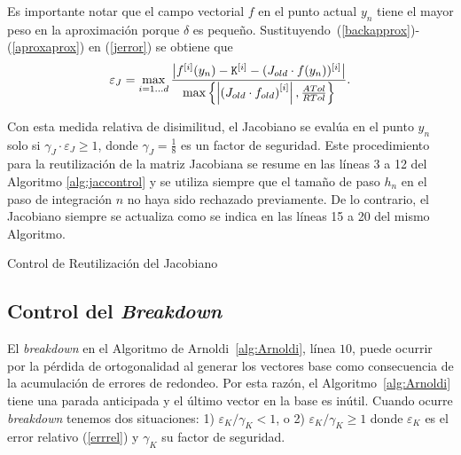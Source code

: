 Es importante notar que el campo vectorial $f$ en el punto actual $y_n$ tiene el mayor peso en la aproximación porque $\delta$
es pequeño. Sustituyendo~(\ref{backapprox})-(\ref{aproxaprox}) en (\ref{jerror}) se obtiene que
\begin{equation}\label{jerroraprox}
    \varepsilon_J = \max_{i=1\ldots d}\frac{\left\lvert f^{[i]}(y_n) - \mathtt{K}^{[i]} - (J_{old}\cdot f(y_n))^{[i]} \right\rvert}
    {\max\left\{ \left\lvert  \left(J_{old}\cdot f_{old}\right)^{[i]}  \right\rvert ,\frac{ATol}{RTol} \right\}}.
\end{equation}

Con esta medida relativa de disimilitud, el Jacobiano se evalúa en el punto $y_n$ solo si $\gamma_J \cdot \varepsilon_J \geq 1$, donde $\gamma_J=\frac{1}{8}$ es un factor de seguridad. Este procedimiento para la reutilización de la matriz Jacobiana se resume en las líneas 3 a 12 del Algoritmo \ref{alg:jaccontrol} y se utiliza siempre que el tamaño de paso $h_n$ en el paso de integración $n$ no haya sido rechazado previamente. De lo contrario, el Jacobiano siempre se actualiza como se indica en las líneas 15 a 20 del mismo Algoritmo.

{\SetAlgoNoLine
\begin{algorithm}[h]
	\caption{Control de Reutilización del Jacobiano}
	\label{alg:jaccontrol}
	{
	}
\end{algorithm}
}

\subsection{Control del \textit{Breakdown}}\label{sec:brcontrol}
El \emph{breakdown} en el Algoritmo de Arnoldi~\ref{alg:Arnoldi}, línea $10$, puede ocurrir por la pérdida de ortogonalidad al generar los vectores base como consecuencia de la acumulación de errores de redondeo. Por esta razón, el Algoritmo~\ref{alg:Arnoldi} tiene una parada anticipada y el último vector en la base es inútil. Cuando ocurre \emph{breakdown} tenemos dos situaciones: 1) $\varepsilon_{K}/\gamma_K< 1$, o 2) $\varepsilon_{K}/\gamma_K \geq 1$ donde $\varepsilon_{K}$ es el error relativo (\ref{errrel}) y $\gamma_K$ su factor de seguridad.

